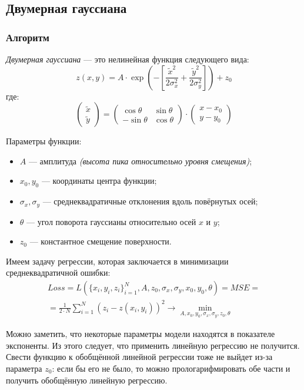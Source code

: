 \subsection{Двумерная гауссиана}

\subsubsection{Алгоритм}

\textit{Двумерная гауссиана} --- это нелинейная функция следующего вида:
\[
z(x, y) = A \cdot \exp \left( - \left[ \frac{\tilde{x}^2}{2\sigma_x^2} + \frac{\tilde{y}^2}{2\sigma_y^2} \right] \right) + z_0
\]
где:
\[
\begin{pmatrix}
\tilde{x} \\
\tilde{y}
\end{pmatrix}
=
\begin{pmatrix}
\cos\theta & \sin\theta \\
-\sin\theta & \cos\theta
\end{pmatrix}
\cdot
\begin{pmatrix}
x - x_0 \\
y - y_0
\end{pmatrix}
\]

Параметры функции:
\begin{itemize}
  \item $A$ --- амплитуда \textit{(высота пика относительно уровня смещения)};
  \item $x_0, y_0$ --- координаты центра функции;
  \item $\sigma_x, \sigma_y$ --- среднеквадратичные отклонения вдоль повёрнутых осей;
  \item $\theta$ --- угол поворота гауссианы относительно осей $x$ и $y$;
  \item $z_0$ --- константное смещение поверхности.
\end{itemize}

Имеем задачу регрессии, которая заключается в минимизации среднеквадратичной ошибки:
\[
\begin{gathered}
  Loss = L(\{x_i,y_i,z_i\}^N_{i=1},A,z_0,\sigma_x,\sigma_y,x_0,y_0,\theta) = MSE = \\
  =\frac{1}{2\cdot N} \sum_{i=1}^{N} (z_i - z(x_i,y_i))^2 \to \min_{A,x_0,y_0,\sigma_x,\sigma_y,z_0,\theta}
\end{gathered}
\]

Можно заметить, что некоторые параметры модели находятся в показателе экспоненты. Из этого следует, что применить линейную регрессию не получится. Свести функцию к обобщённой линейной регрессии тоже не выйдет из-за параметра \( z_0 \): если бы его не было, то можно прологарифмировать обе части и получить обобщённую линейную регрессию.

